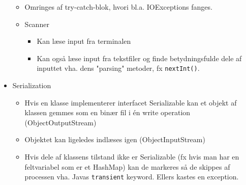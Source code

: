 \begin{itemize}
\begin{itemize}
    \item Omringes af try-catch-blok, hvori bl.a. IOExceptions fanges.
    \item Scanner
    \begin{itemize}
      \item Kan læse input fra terminalen
      \item Kan også læse input fra tekstfiler og finde betydningsfulde dele af inputtet vha. dens "parsing" metoder, fx \verb|nextInt()|.
    \end{itemize}
  \end{itemize}
  \item Serialization
  \begin{itemize}
    \item Hvis en klasse implementerer interfacet Serializable kan et objekt af klassen gemmes som en binær fil i én write operation (ObjectOutputStream)
    \item Objektet kan ligeledes indlæses igen (ObjectInputStream)
    \item Hvis dele af klassens tilstand ikke er Serializable (fx hvis man har en feltvariabel som er et HashMap) kan de markeres så de skippes af processen vha. Javas \verb|transient| keyword. Ellers kastes en exception.
  \end{itemize}
\end{itemize}

